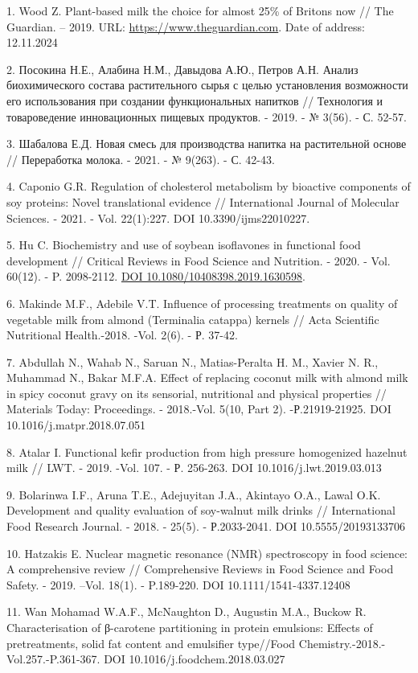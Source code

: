 \begin{references}
1. Wood Z. Plant-based milk the choice for almost 25\% of Britons now //
The Guardian. -- 2019. URL:
\href{https://www.theguardian.com/food/2019/jul/19/plant-based-milk-the-choice-for-almost-25-of-britons-now}{https://www.theguardian.com}.
Date of address: 12.11.2024

2. Посокина Н.Е., Алабина Н.М., Давыдова А.Ю., Петров А.Н. Анализ
биохимического состава растительного сырья с целью установления
возможности его использования при создании функциональных напитков //
Технология и товароведение инновационных пищевых продуктов. - 2019. - №
3(56). - С. 52-57.

3. Шабалова Е.Д. Новая смесь для производства напитка на растительной
основе // Переработка молока. - 2021. - № 9(263). - С. 42-43.

4. Caponio G.R. Regulation of cholesterol metabolism by bioactive
components of soy proteins: Novel translational evidence //
International Journal of Molecular Sciences. - 2021. - Vol. 22(1):227.
DOI 10.3390/ijms22010227.

5. Hu C. Biochemistry and use of soybean isoflavones in functional food
development // Critical Reviews in Food Science and Nutrition. - 2020. -
Vol. 60(12). - P. 2098-2112.
\href{https://doi.org/10.1080/10408398.2019.1630598}{DOI
10.1080/10408398.2019.1630598}.

6. Makinde M.F., Adebile V.T. Influence of processing treatments on
quality of vegetable milk from almond (Terminalia catappa) kernels //
Acta Scientific Nutritional Health.-2018. -Vol. 2(6). - Р. 37-42.

7. Abdullah N., Wahab N., Saruan N., Matias-Peralta H. M., Xavier N. R.,
Muhammad N., Bakar M.F.A. Effect of replacing coconut milk with almond
milk in spicy coconut gravy on its sensorial, nutritional and physical
properties // Materials Today: Proceedings. - 2018.-Vol. 5(10, Part 2).
-Р.21919-21925. DOI 10.1016/j.matpr.2018.07.051

8. Atalar I. Functional kefir production from high pressure homogenized
hazelnut milk // LWT. - 2019. -Vol. 107. - Р. 256-263. DOI
10.1016/j.lwt.2019.03.013

9. Bolarinwa I.F., Aruna T.E., Adejuyitan J.A., Akintayo O.A., Lawal
O.K. Development and quality evaluation of soy-walnut milk drinks //
International Food Research Journal. - 2018. - 25(5). - Р.2033-2041. DOI
10.5555/20193133706

10. Hatzakis E. Nuclear magnetic resonance (NMR) spectroscopy in food
science: A comprehensive review // Comprehensive Reviews in Food Science
and Food Safety. - 2019. --Vol. 18(1). - P.189-220. DOI
10.1111/1541-4337.12408

11. Wan Mohamad W.A.F., McNaughton D., Augustin M.A., Buckow R.
Characterisation of β-carotene partitioning in protein emulsions:
Effects of pretreatments, solid fat content and emulsifier type//Food
Chemistry.-2018.-Vol.257.-P.361-367. DOI 10.1016/j.foodchem.2018.03.027
\end{references}

